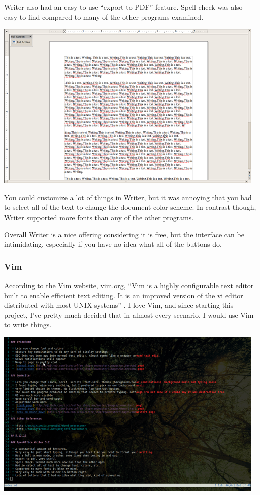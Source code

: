 \documentclass[11pt]{article}
\begin{document}
Writer also had an easy to use ``export to PDF'' feature. Spell check was also easy to find compared to many of the other programs examined.

\includegraphics[width=130mm]{images/oo3.png}

You could customize a lot of things in Writer, but it was annoying that you had to select all of the text to change the document color scheme. In contrast though, Writer supported more fonts than any of the other programs.

Overall Writer is a nice offering considering it is free, but the interface can be intimidating, especially if you have no idea what all of the buttons do.

\subsubsection{Vim}

According to the Vim website, vim.org, ``Vim is a highly configurable text editor built to enable efficient text editing. It is an improved version of the vi editor distributed with most UNIX systems'' \cite{vimabout}. I love Vim, and since starting this project, I've pretty much decided that in almost every scenario, I would use Vim to write things. 

\includegraphics[width=130mm]{images/vim2.png}
\end{document}
